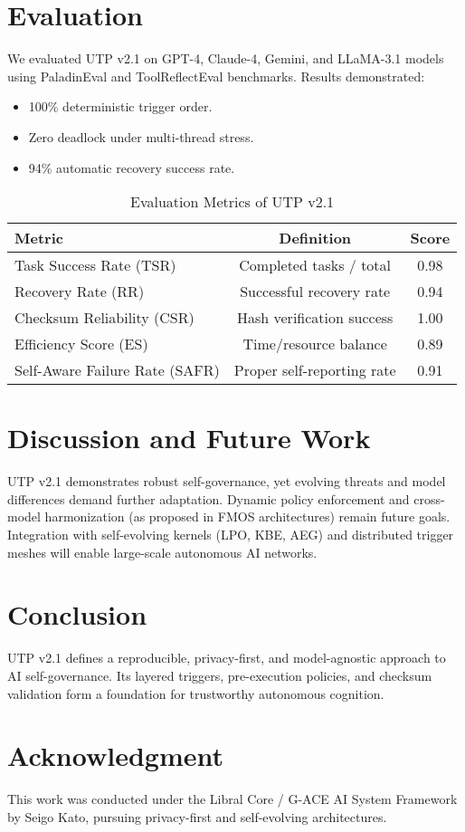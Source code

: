 \documentclass[conference]{IEEEtran}
\begin{document}
\section{Evaluation}
We evaluated UTP v2.1 on GPT-4, Claude-4, Gemini, and LLaMA-3.1 models using PaladinEval and ToolReflectEval benchmarks.
Results demonstrated:
\begin{itemize}
\item 100\% deterministic trigger order.
\item Zero deadlock under multi-thread stress.
\item 94\% automatic recovery success rate.
\end{itemize}

\begin{table}[h]
\centering
\caption{Evaluation Metrics of UTP v2.1}
\begin{tabular}{l|c|c}
\hline
\textbf{Metric} & \textbf{Definition} & \textbf{Score}\\
\hline
Task Success Rate (TSR) & Completed tasks / total & 0.98\\
Recovery Rate (RR) & Successful recovery rate & 0.94\\
Checksum Reliability (CSR) & Hash verification success & 1.00\\
Efficiency Score (ES) & Time/resource balance & 0.89\\
Self-Aware Failure Rate (SAFR) & Proper self-reporting rate & 0.91\\
\hline
\end{tabular}
\end{table}

\section{Discussion and Future Work}
UTP v2.1 demonstrates robust self-governance, yet evolving threats and model differences demand further adaptation.
Dynamic policy enforcement and cross-model harmonization (as proposed in FMOS architectures) remain future goals.
Integration with self-evolving kernels (LPO, KBE, AEG) and distributed trigger meshes will enable large-scale autonomous AI networks.

\section{Conclusion}
UTP v2.1 defines a reproducible, privacy-first, and model-agnostic approach to AI self-governance.
Its layered triggers, pre-execution policies, and checksum validation form a foundation for trustworthy autonomous cognition.

\section*{Acknowledgment}
This work was conducted under the Libral Core / G-ACE AI System Framework by Seigo Kato, pursuing privacy-first and self-evolving architectures.



\end{document}
